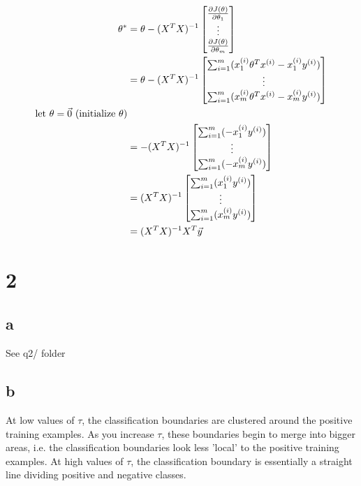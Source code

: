 \documentclass[11pt]{article}
\begin{document}
\begin{align*}
  \theta^{*} &= 
  \theta - (X^{T} X)^{-1}
  \begin{bmatrix}
    \frac{\partial J(\theta)}{\partial\theta_{1}} \\
    \vdots \\
    \frac{\partial J(\theta)}{\partial\theta_{m}}
  \end{bmatrix}
  \\ &= 
  \theta - (X^{T} X)^{-1}
  \begin{bmatrix}
    \sum_{i=1}^{m} ( x_{1}^{(i)} \theta^{T} x^{(i)} - x_{1}^{(i)} y^{(i)} ) \\
    \vdots \\
    \sum_{i=1}^{m} ( x_{m}^{(i)} \theta^{T} x^{(i)} - x_{m}^{(i)} y^{(i)} )
  \end{bmatrix}
  \\ \text{let $\theta = \vec{0}$ (initialize $\theta$)}
  \\ &= 
  - (X^{T} X)^{-1}
  \begin{bmatrix}
    \sum_{i=1}^{m} ( - x_{1}^{(i)} y^{(i)} ) \\
    \vdots \\
    \sum_{i=1}^{m} ( - x_{m}^{(i)} y^{(i)} )
  \end{bmatrix}
  \\ &=
  (X^{T} X)^{-1}
  \begin{bmatrix}
    \sum_{i=1}^{m} ( x_{1}^{(i)} y^{(i)} ) \\
    \vdots \\
    \sum_{i=1}^{m} ( x_{m}^{(i)} y^{(i)} )
  \end{bmatrix}
  \\ &=
  (X^{T} X)^{-1} X^{T} \vec{y}
\end{align*}
  


\section*{2}

\subsection*{a}
See q2/ folder

\subsection*{b}
At low values of $\tau$, the classification boundaries are clustered around the positive training examples. As you increase $\tau$, these boundaries begin to merge into bigger areas, i.e. the classification boundaries look less 'local' to the positive training examples. At high values of $\tau$, the classification boundary is essentially a straight line dividing positive and negative classes. \\
\end{document}
